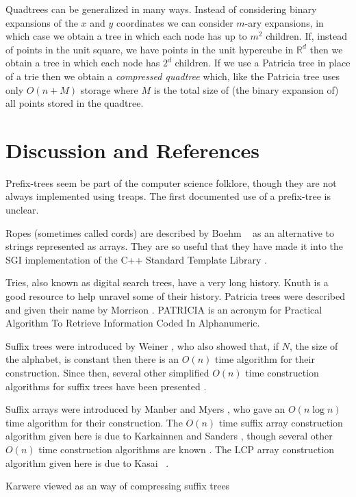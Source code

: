 Quadtrees can be generalized in many ways.  Instead of considering
binary expansions of the $x$ and $y$ coordinates we can consider
$m$-ary expansions, in which case we obtain a tree in which each node
has up to $m^2$ children.  If, instead of points in the unit square,
we have points in the unit hypercube in $\mathbb{R}^d$ then we obtain
a tree in which each node has $2^d$ children.  If we use a Patricia
tree in place of a trie then we obtain a \emph{compressed quadtree}
which, like the Patricia tree uses only $O(n+M)$ storage where $M$ is
the total size of (the binary expansion of) all points stored in the
quadtree.  

\section{Discussion and References}

Prefix-trees seem be part of the computer science folklore, though
they are not always implemented using treaps. The first documented use
of a prefix-tree is unclear.

Ropes (sometimes called cords) are described by Boehm \etal\ \cite{bap95}
as an alternative to strings represented as arrays.  They are so useful
that they have made it into the SGI implementation of the C++ Standard
Template Library \cite{x}.

Tries, also known as digital search trees, have a very long history.
Knuth \cite{k73c} is a good resource to help unravel some of their
history.  Patricia trees were described and given their name by
Morrison \cite{m68}.  PATRICIA is an acronym for Practical Algorithm
To Retrieve Information Coded In Alphanumeric.

Suffix trees were introduced by Weiner \cite{w73}, who also showed
that, if $N$, the size of the alphabet, is constant then there is an
$O(n)$ time algorithm for their construction.  Since then, several
other simplified $O(n)$ time construction algorithms for suffix trees
have been presented \cite{cs85,m76,f97}.

Suffix arrays were introduced by Manber and Myers \cite{S}, who gave an
$O(n\log n)$ time algorithm for their construction.  The $O(n)$ time
suffix array construction algorithm given here is due to Karkainnen
and Sanders \cite{x}, though several other $O(n)$ time construction
algorithms are known \cite{S}.  The LCP array construction algorithm
given here is due to Kasai \etal\ \cite{kS}.

Karwere viewed as an way of compressing suffix trees \cite{S}


